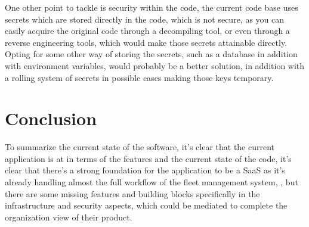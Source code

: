 One other point to tackle is security within the code, the current code base uses secrets
which are stored directly in the code, which is not secure, as you can easily acquire the
original code through a decompiling tool, or even through a reverse engineering tools,
which would make those secrets attainable directly. Opting for some other way of storing
the secrets, such as a database in addition with environment variables, would probably be
a better solution, in addition with a rolling system of secrets in possible cases making
those keys temporary.

\section{Conclusion}

To summarize the current state of the software, it's clear that the current application
is at in terms of the features and the current state of the code, it's clear that there's
a strong foundation for the application to be a SaaS as it's already handling almost the
full workflow of the fleet management system, , but there are some missing features and
building blocks specifically in the infrastructure and security aspects, which could be
mediated to complete the organization view of their product.
